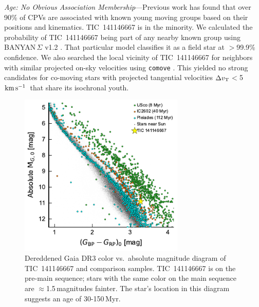 \documentclass{nature3}
\newcommand{\kms}{\ensuremath{\rm km\,s^{-1}}}
\begin{document}
\begin{methods}
{\it Age: No Obvious Association Membership}---Previous work
\cite{Bouma2024} has found that over 90\% of CPVs are associated with
known young moving groups based on their positions and kinematics.
TIC~141146667 is in the minority.  We calculated the probability of
TIC~141146667 being part of any nearby known group using
BANYAN\,$\Sigma$ v1.2 \cite{Gagne2018}.  That particular model
classifies it as a field star at $>$99.9\% confidence.  We also
searched the local vicinity of TIC~141146667 for neighbors with
similar projected on-sky velocities using \texttt{comove}
\cite{Tofflemire2021}.  This yielded no strong candidates for
co-moving stars with projected tangential velocities $\Delta v_{\rm
T}$$<$5\,\kms\ that share its isochronal youth.

\begin{figure}[!t]
  \centering
  \includegraphics[width=0.7\textwidth]{figures/sf3.pdf}
  \caption{Dereddened Gaia DR3 color vs.~absolute magnitude diagram of
  TIC~141146667 and comparison samples. 
  TIC~141146667 is on the pre-main sequence; stars with the same color
  on the main sequence are $\approx$1.5\,magnitudes
  fainter.  The star's location in this diagram suggests an
  age of 30-150\,Myr.  }
  \label{fig:camd}
\end{figure}



\end{methods}
\end{document}
